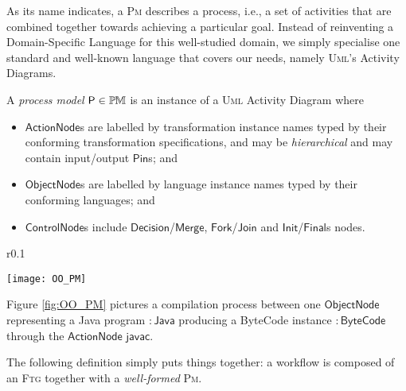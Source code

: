 \medskip
As its name indicates, a \textsc{Pm} describes a process, i.e., a set of 
activities that are combined together towards achieving a particular goal. 
Instead of reinventing a Domain-Specific Language for this well-studied domain, 
we simply specialise one standard and well-known language that covers our 
needs, namely \textsc{Uml}'s Activity Diagrams.


\begin{Definition}
A \emph{process model} $\mathsf{P}\in\mathbb{P}\mskip-1mu\mathbb{M}$ is an instance of a \textsc{Uml}
Activity Diagram where
\begin{itemize}
   \item $\mathsf{ActionNode}$s are labelled by transformation instance names 
typed by their conforming transformation specifications, and may be 
\emph{hierarchical} and may contain input/output $\mathsf{Pin}$s; and 
   \item $\mathsf{ObjectNode}$s are labelled by language instance names typed 
by their conforming languages; and 
   \item $\mathsf{ControlNode}$s include 
$\mathsf{Decision}$/$\mathsf{Merge}$, $\mathsf{Fork}$/$\mathsf{Join}$ and 
$\mathsf{Init}$/$\mathsf{Final}$s nodes.   
\end{itemize}
\end{Definition}
\begin{wrapfigure}[9]{r}{0.1\textwidth}
  \begin{center}
    \texttt{[image: OO\_PM]}
  \end{center}
  \caption{Simple compiling \textsc{PM}.}
  \label{fig:OO_PM}
\end{wrapfigure}
Figure \ref{fig:OO_PM} pictures a compilation process between one 
$\mathsf{ObjectNode}$ representing a Java program $\mathsf{:Java}$ producing a 
ByteCode instance $\mathsf{:ByteCode}$ through the  $\mathsf{ActionNode}$ 
$\mathsf{javac}$.

\medskip
The following definition simply puts things together: a workflow is composed of 
an \textsc{Ftg} together with a \emph{well-formed} \textsc{Pm}. 



